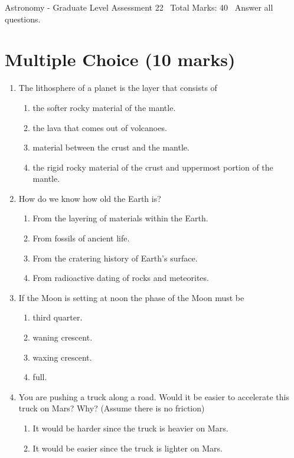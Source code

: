 \documentclass[12pt]{article}
\begin{document}
\begin{center}
Astronomy - Graduate Level Assessment 22 \
Total Marks: 40 \
Answer all questions.
\end{center}

\section*{Multiple Choice (10 marks)}
\begin{enumerate}[label=\arabic*.]
\item The lithosphere of a planet is the layer that consists of
\begin{enumerate}[label=(\alph*)]
    \item the softer rocky material of the mantle.
    \item the lava that comes out of volcanoes.
    \item material between the crust and the mantle.
    \item the rigid rocky material of the crust and uppermost portion of the mantle.
\end{enumerate}
\item How do we know how old the Earth is?
\begin{enumerate}[label=(\alph*)]
    \item From the layering of materials within the Earth.
    \item From fossils of ancient life.
    \item From the cratering history of Earth's surface.
    \item From radioactive dating of rocks and meteorites.
\end{enumerate}
\item If the Moon is setting at noon the phase of the Moon must be
\begin{enumerate}[label=(\alph*)]
    \item third quarter.
    \item waning crescent.
    \item waxing crescent.
    \item full.
\end{enumerate}
\item You are pushing a truck along a road. Would it be easier to accelerate this truck on Mars? Why? (Assume there is no friction)
\begin{enumerate}[label=(\alph*)]
    \item It would be harder since the truck is heavier on Mars.
    \item It would be easier since the truck is lighter on Mars.

\end{enumerate}
\end{enumerate}
\end{document}
